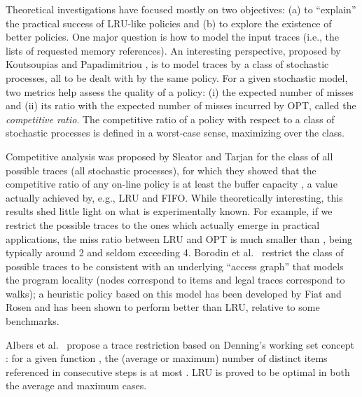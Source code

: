 \documentclass[11pt,a4paper]{article}
\theoremstyle{definition}
\theoremstyle{remark}
\begin{document}
Theoretical investigations have focused mostly on two objectives: (a) to
``explain'' the practical success of LRU-like policies and (b) to explore the
existence of better policies.  One major question is how to model the input
traces (i.e., the lists of requested memory references). An interesting
perspective, proposed by Koutsoupias and Papadimitriou \cite{KoutsoupiasP00}, is
to model traces by a class of stochastic processes, all to be dealt with by the
same policy.  For a given stochastic model, two metrics help assess the quality
of a policy: (i) the expected number of misses and (ii) its ratio with the
expected number of misses incurred by OPT, called the \emph{competitive ratio}.
The competitive ratio of a policy with respect to a class of stochastic
processes is defined in a worst-case sense, maximizing over the class.

Competitive analysis was proposed by Sleator and Tarjan \cite{SleatorT85} for
the class of all possible traces (all stochastic processes), for which they
showed that the competitive ratio of any on-line policy is at least the buffer
capacity , a value actually achieved by, e.g., LRU and FIFO. While
theoretically interesting, this results shed little light on what is
experimentally known. For example, if we restrict the possible traces to the
ones which actually emerge in practical applications, the miss ratio between LRU
and OPT is much smaller than , being typically around 2 and seldom exceeding
4.
Borodin et al.\ \cite{BorodinIRS95} restrict the class of possible
traces to be consistent with an underlying ``access graph'' that
models the program locality (nodes correspond to items and legal
traces correspond to walks); a heuristic policy based on this model has
been developed by Fiat and Rosen \cite{FiatR97} and has been shown to
perform better than LRU, relative to some benchmarks.

Albers et al.\ \cite{AlbersFG05} propose a trace restriction based on
Denning's working set concept \cite{Denning68}: for a given function
, the (average or maximum) number of distinct items referenced
in  consecutive steps is at most . LRU is proved to be
optimal in both the average and maximum cases.
\end{document}
